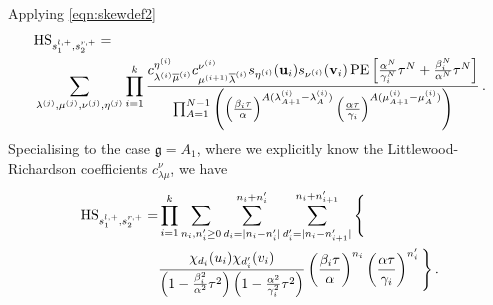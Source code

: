 \documentclass[main.tex]{subfiles}
\begin{document}
Applying \eqref{eqn:skewdef2}
\begin{equation}
\begin{aligned}&\textrm{HS}_{s_{1}^{l,+},s_{2}^{r,+}}=\\
&\sum_{\lambda^{(j)},\mu^{(j)},\nu^{(j)},\eta^{(j)}}\prod_{i=1}^k\frac{c_{\lambda^{(i)}\overline{\mu}^{(i)}}^{\eta^{(i)}}c^{\nu^{(i)}}_{\mu^{(i+1)}\overline{\lambda}^{(i)}}s_{\eta^{(i)}}(\mathbf{u}_i)s_{\nu^{(i)}}(\mathbf{v}_i)\operatorname{\mathrm{PE}}\left[\frac{\alpha^N}{\gamma_i^N}\tau^N+\frac{\beta_i^N}{\alpha^N}\tau^N\right]}{\prod_{A=1}^{N-1}\left(\left(\frac{\beta_i\tau}{\alpha}\right)^{A(\lambda_{A+1}^{(i)}-\lambda_A^{(i)})}\left(\frac{\alpha\tau}{\gamma_i}\right)^{A(\mu_{A+1}^{(i)}-\mu_A^{(i)})}\right)}\,.
\end{aligned}
\end{equation}
Specialising to the case $\mathfrak{g}=A_{1}$, where we explicitly know the Littlewood-Richardson coefficients $c_{\lambda\mu}^{\nu}$, we have
\begin{equation}
\begin{aligned}
\textrm{HS}_{s_{1}^{l,+},s_{2}^{r,+}}=&\prod_{i=1}^k\sum_{n_i,n'_i\geq0}\sum_{d_i=|n_i-n'_i|}^{n_i+n'_i}\sum_{d'_i=|n_i-n'_{i+1}|}^{n_i+n'_{i+1}}\Bigg\{\\
&\frac{\chi_{d_i}(u_i)\chi_{d'_i}(v_i)}{\left(1-\frac{\beta_i^2}{\alpha^2}\tau^2\right)\left(1-\frac{\alpha^2}{\gamma_i^2}\tau^2\right)}\left(\frac{\beta_i\tau}{\alpha}\right)^{n_i}\left(\frac{\alpha\tau}{\gamma_i}\right)^{n'_i}\Bigg\}\,.
\end{aligned}
\end{equation}
\end{document}

